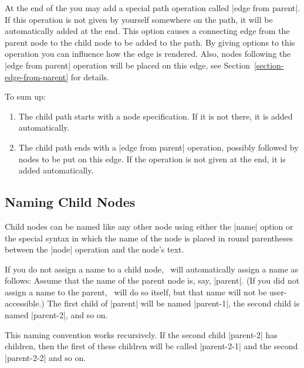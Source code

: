 \begin{codeexample}[]
\end{codeexample}


At the end of the  you may add a special path
operation called |edge from parent|. If this operation is not given by
yourself somewhere on the path, it will be automatically added at the
end. This option causes a connecting edge from the parent node to the
child node to be added to the path. By giving options to this
operation you can influence how the edge is rendered. Also, nodes
following the |edge from parent| operation will be placed on this
edge, see Section~\ref{section-edge-from-parent} for details.

To sum up:
\begin{enumerate}
\item
  The child path starts with a node specification. If it is not there,
  it is added automatically.
\item
  The child path ends with a |edge from parent| operation, possibly
  followed by nodes to be put on this edge. If the operation is not
  given at the end, it is added automatically.
\end{enumerate}



\subsection{Naming Child Nodes}

Child nodes can be named like any other node using either the |name|
option or the special syntax in which the name of the node is placed
in round parentheses between the |node| operation and the node's
text.

If you do not assign a name to a child node, \tikzname\ will
automatically assign a name as follows: Assume that the name of the
parent node is, say, |parent|. (If you did not assign a
name to the parent, \tikzname\ will do so itself, but that name will
not be user-accessible.) The first child
of |parent| will be named |parent-1|, the second child is named
|parent-2|, and so on.

This naming convention works recursively. If the second child
|parent-2| has children, then the first of these children will be
called |parent-2-1| and the second |parent-2-2| and so on.

